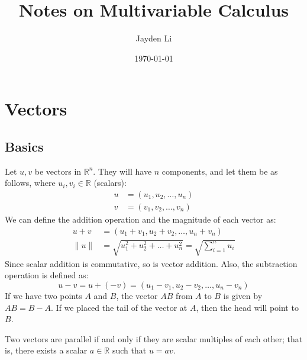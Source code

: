 \documentclass{article}
\title{\vspace*{-40pt}Notes on Multivariable Calculus}
\author{Jayden Li}
\date{\today}
\begin{document}
\fontsize{11pt}{12pt}\selectfont
\setlength{\abovedisplayskip}{\abovedisplayskip/2}
\setlength{\belowdisplayskip}{\belowdisplayskip/2}
\setlength{\parindent}{0pt}
\setlength{\parskip}{2ex plus 0.5ex minus 0.2ex}
\maketitle

\tableofcontents

\section{Vectors}

\subsection{Basics}

Let $u,v$ be vectors in $\mathbb R^n$. They will have $n$ components, and let them be as follows, where $u_i,v_i\in\mathbb R$ (scalars):
\begin{align*}
	u&=(u_1,u_2,\ldots,u_n) \\
	v&=(v_1,v_2,\ldots,v_n)
\end{align*}
We can define the addition operation and the magnitude of each vector as:
\begin{align*}
	u+v&=(u_1+v_1,u_2+v_2,\ldots,u_n+v_n) \\
	\lVert u \rVert &=\sqrt{u_1^2+u_2^2+\ldots+u_n^2}=\sqrt{\sum_{i=1}^{n}u_i}
\end{align*}
Since scalar addition is commutative, so is vector addition. Also, the subtraction operation is defined as:
\begin{equation*}
    u-v=u+(-v)=(u_1-v_1,u_2-v_2,\ldots,u_n-v_n)
\end{equation*}
If we have two points $A$ and $B$, the vector $AB$ from $A$ to $B$ is given by $AB=B-A$. If we placed the tail of the vector at $A$, then the head will point to $B$.

Two vectors are parallel if and only if they are scalar multiples of each other; that is, there exists a scalar $a\in\mathbb R$ such that $u=av$.
\end{document}
